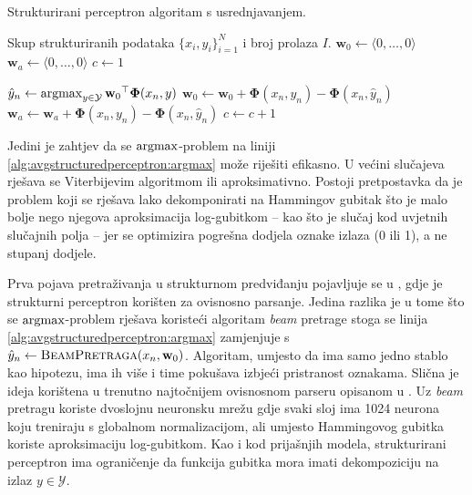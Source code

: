 \begin{algorithm}
\caption{Strukturirani perceptron algoritam s usrednjavanjem.}
\label{alg:avgstructuredperceptron}
\begin{algorithmic}[1]
\Require Skup strukturiranih podataka $\{x_i, y_i\}_{i=1}^N$ i broj prolaza $I$.
\State $\mathbf{w}_0 \gets \langle 0, \ldots, 0 \rangle$
\State $\mathbf{w}_a \gets \langle 0, \ldots, 0 \rangle$
\State $c \gets 1$

    \State $\hat{y}_n \gets \operatorname*{argmax}_{y \in \mathcal{Y}} {\mathbf{w}_0}^\top \mathbf{\Phi}(x_n, y)$ \label{alg:avgstructuredperceptron:argmax}
    \label{alg:structuredperceptron:condition}
    \State $\mathbf{w}_0 \gets \mathbf{w}_0 + \mathbf{\Phi}(x_n, y_n) - \mathbf{\Phi}(x_n, \hat{y}_n)$
    \State $\mathbf{w}_a \gets \mathbf{w}_a + \mathbf{\Phi}(x_n, y_n) - \mathbf{\Phi}(x_n, \hat{y}_n)$
    \EndIf
    \State $c \gets c + 1$
  \EndFor

\EndFor

\State {}
\end{algorithmic}
\end{algorithm}

Jedini je zahtjev da se $\operatorname*{argmax}$-problem na liniji
\ref{alg:avgstructuredperceptron:argmax} može riješiti efikasno. U većini
slučajeva rješava se Viterbijevim algoritmom ili aproksimativno. Postoji pretpostavka
da je problem koji se rješava lako dekomponirati na Hammingov gubitak što je
malo bolje nego njegova aproksimacija log-gubitkom -- kao što je slučaj kod
uvjetnih slučajnih polja -- jer se optimizira pogrešna dodjela oznake izlaza (0
ili 1), a ne stupanj dodjele.

Prva pojava pretraživanja u strukturnom predviđanju pojavljuje se u
\citep{collins2004incremental}, gdje je strukturni perceptron korišten za
ovisnosno parsanje. Jedina razlika je u tome što se $\operatorname*{argmax}$-problem rješava
koristeći algoritam \textit{beam} pretrage stoga se linija
\ref{alg:avgstructuredperceptron:argmax} zamjenjuje s $\hat{y}_n \gets
\textsc{BeamPretraga}(x_n, \mathbf{w}_0)$. Algoritam, umjesto da ima samo jedno
stablo kao hipotezu, ima ih više i time pokušava izbjeći pristranost oznakama.
Slična je ideja korištena u trenutno najtočnijem ovisnosnom parseru opisanom u
\citep{andor2016globally}. Uz \textit{beam} pretragu koriste dvoslojnu neuronsku
mrežu gdje svaki sloj ima 1024 neurona koju treniraju s globalnom
normalizacijom, ali umjesto Hammingovog gubitka koriste aproksimaciju
log-gubitkom. Kao i kod prijašnjih modela, strukturirani perceptron ima
ograničenje da funkcija gubitka mora imati dekompoziciju na izlaz $y \in
\mathcal{Y}$.
